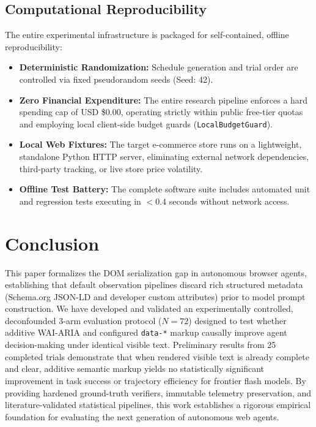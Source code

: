 \documentclass[11pt,a4paper]{article}
\begin{document}
\subsection{Computational Reproducibility}
The entire experimental infrastructure is packaged for self-contained, offline reproducibility:
\begin{itemize}
    \item \textbf{Deterministic Randomization:} Schedule generation and trial order are controlled via fixed pseudorandom seeds (Seed: 42).
    \item \textbf{Zero Financial Expenditure:} The entire research pipeline enforces a hard spending cap of USD \$0.00, operating strictly within public free-tier quotas and employing local client-side budget guards (\texttt{LocalBudgetGuard}).
    \item \textbf{Local Web Fixtures:} The target e-commerce store runs on a lightweight, standalone Python HTTP server, eliminating external network dependencies, third-party tracking, or live store price volatility.
    \item \textbf{Offline Test Battery:} The complete software suite includes automated unit and regression tests executing in $<0.4$ seconds without network access.
\end{itemize}

\section{Conclusion}
\label{sec:conclusion}

This paper formalizes the DOM serialization gap in autonomous browser agents, establishing that default observation pipelines discard rich structured metadata (Schema.org JSON-LD and developer custom attributes) prior to model prompt construction. We have developed and validated an experimentally controlled, deconfounded 3-arm evaluation protocol ($N=72$) designed to test whether additive WAI-ARIA and configured \texttt{data-*} markup causally improve agent decision-making under identical visible text. Preliminary results from 25 completed trials demonstrate that when rendered visible text is already complete and clear, additive semantic markup yields no statistically significant improvement in task success or trajectory efficiency for frontier flash models. By providing hardened ground-truth verifiers, immutable telemetry preservation, and literature-validated statistical pipelines, this work establishes a rigorous empirical foundation for evaluating the next generation of autonomous web agents.



\end{document}

